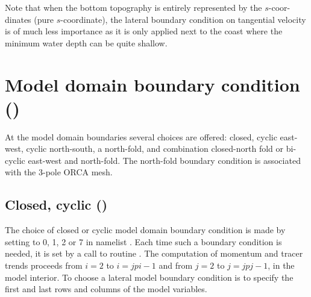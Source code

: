 \documentclass[../main/NEMO_manual]{subfiles}
\begin{document}
Note that when the bottom topography is entirely represented by the $s$-coor-dinates (pure $s$-coordinate),
the lateral boundary condition on tangential velocity is of much less importance as
it is only applied next to the coast where the minimum water depth can be quite shallow.


\section{Model domain boundary condition (\protect{})}
\label{sec:LBC_jperio}

At the model domain boundaries several choices are offered:
closed, cyclic east-west, cyclic north-south, a north-fold, and combination closed-north fold or
bi-cyclic east-west and north-fold.
The north-fold boundary condition is associated with the 3-pole ORCA mesh. 

\subsection{Closed, cyclic (\protect{}\forcode{= [0127]})}
\label{subsec:LBC_jperio012}

The choice of closed or cyclic model domain boundary condition is made by
setting  to 0, 1, 2 or 7 in namelist .
Each time such a boundary condition is needed, it is set by a call to routine .
The computation of momentum and tracer trends proceeds from $i=2$ to $i=jpi-1$ and from $j=2$ to $j=jpj-1$,
\ie in the model interior.
To choose a lateral model boundary condition is to specify the first and last rows and columns of
the model variables. 
\end{document}
